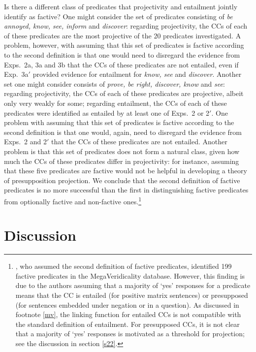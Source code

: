 \documentclass[11pt,fleqn]{article}
\newcommand{\6}{\mbox{$[\hspace*{-.6mm}[$}}
\newcommand{\9}{\mbox{$]\hspace*{-.6mm}]$}}
\begin{document}
{Is there a different class of predicates that projectivity and entailment jointly identify as factive? One might consider the set of predicates consisting of {\em be annoyed, know, see, inform} and {\em discover}: regarding projectivity,  the CCs of each of these predicates are the most projective of the 20 predicates investigated. A problem, however, with assuming that this set of predicates is factive according to the second definition is that one would need to disregard the evidence from Exps.~2a, 3a and 3b that the CCs of these predicates are not entailed, even if Exp.~3a$'$ provided evidence for entailment for {\em know, see} and {\em discover}. Another set one might consider consists of {\em  prove, be right, discover, know} and {\em see}: regarding projectivity, the CCs of each of these predicates are projective, albeit only very weakly for some; regarding entailment, the CCs of each of these predicates were identified as entailed by at least one of Exps.~2 or 2$'$. One problem with assuming that this set of predicates is factive according to the second definition is that one would, again, need to disregard the evidence from Exps.~2 and 2$'$ that the CCs of these predicates are not entailed. Another problem is that this set of predicates does not form a natural class, given how much the CCs of these predicates differ in projectivity: for instance, assuming that these five predicates are factive would not be helpful in developing a theory of presupposition projection. We conclude that the second definition of factive predicates is no more successful than the first in distinguishing factive predicates from optionally factive and non-factive ones.\footnote{\citet{white-rawlins-nels2018}, who assumed the second definition of factive predicates, identified 199 factive predicates in the MegaVeridicality database. However,  this finding is due to the authors assuming that a majority of `yes' responses for a predicate means that the CC is entailed (for positive matrix sentences) or presupposed (for sentences embedded under negation or in a question). As discussed in footnote \ref{mv}, the linking function for entailed CCs is not compatible with the standard definition of entailment. For presupposed CCs, it is not clear that a majority of `yes' responses is motivated as a threshold for projection; see the discussion in section \ref{s22}.} 

\section{Discussion}\label{s4}

}
\end{document}
